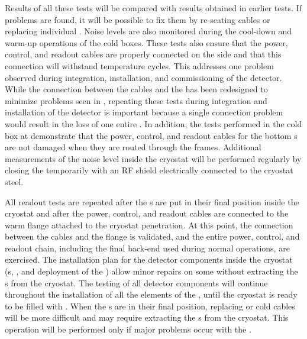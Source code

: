 Results of all these tests will be compared with results obtained 
in earlier  tests.  If problems are found, it will be possible 
to fix them by re-seating cables or replacing individual .
Noise levels are also monitored during the cool-down and warm-up 
operations of the cold boxes. These tests also ensure that the power,
control, and readout cables are properly connected
on the  side and that this connection will withstand temperature 
cycles. This addresses one problem observed during integration,
installation, and commissioning of the  
detector. While the connection between the cables and the 
has been redesigned to minimize problems seen in ,
repeating these tests during integration
and installation of the detector is important because a single connection problem would
result in the loss of one entire . In addition, the tests 
performed in the cold box at  demonstrate that the power, control, and
readout cables for the bottom s are not damaged when they are routed 
through the  frames. Additional measurements of the noise
level inside the cryostat will be performed regularly by closing 
the  temporarily with an RF shield electrically connected 
to the cryostat steel. 

All readout tests are repeated after the s are put
in their final position inside the cryostat and after the power, control, and
readout cables are connected to the warm flange attached to the cryostat
penetration. At this point, the connection between the cables and the flange
is validated, and the entire power, control, and readout chain, including the
final  back-end used during normal operations, are exercised. The
installation plan for the detector components inside the cryostat (s,
, and deployment of the ) allow minor repairs on some  without extracting
the s from the cryostat. The testing of all detector components
will continue throughout the installation of all the elements of the , 
until the cryostat is ready to be filled with .  When the 
s are in their final position, replacing  
or cold cables will be more difficult and may require extracting the s 
from the cryostat. This operation will be performed only if major problems occur with the .

